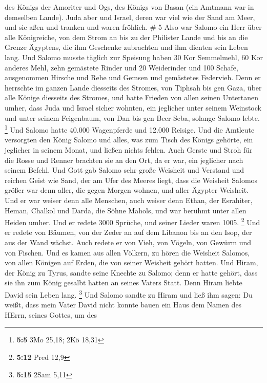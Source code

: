 des Königs der Amoriter und Ogs, des Königs von Basan (ein Amtmann war
in demselben Lande).  Juda aber und Israel, deren war viel
wie der Sand am Meer, und sie aßen und tranken und waren fröhlich. \# 5
 Also war Salomo ein Herr über alle Königreiche, von dem
Strom an bis zu der Philister Lande und bis an die Grenze Ägyptens, die
ihm Geschenke zubrachten und ihm dienten sein Leben lang. 
Und Salomo musste täglich zur Speisung haben 30 Kor Semmelmehl, 60 Kor
anderes Mehl,  zehn gemästete Rinder und 20 Weiderinder und
100 Schafe, ausgenommen Hirsche und Rehe und Gemsen und gemästetes
Federvieh.  Denn er herrschte im ganzen Lande diesseits des
Stromes, von Tiphsah bis gen Gaza, über alle Könige diesseits des
Stromes, und hatte Frieden von allen seinen Untertanen umher,
 dass Juda und Israel sicher wohnten, ein jeglicher unter
seinem Weinstock und unter seinem Feigenbaum, von Dan bis gen Beer-Seba,
solange Salomo lebte. \footnote{\textbf{5:5} 3Mo 25,18; 2Kö 18,31}
 Und Salomo hatte 40.000 Wagenpferde und 12.000 Reisige.
 Und die Amtleute versorgten den König Salomo und alles, was
zum Tisch des Königs gehörte, ein jeglicher in seinem Monat, und ließen
nichts fehlen.  Auch Gerste und Stroh für die Rosse und
Renner brachten sie an den Ort, da er war, ein jeglicher nach seinem
Befehl.  Und Gott gab Salomo sehr große Weisheit und
Verstand und reichen Geist wie Sand, der am Ufer des Meeres liegt,
 dass die Weisheit Salomos größer war denn aller, die gegen
Morgen wohnen, und aller Ägypter Weisheit.  Und er war
weiser denn alle Menschen, auch weiser denn Ethan, der Esrahiter, Heman,
Chalkol und Darda, die Söhne Mahols, und war berühmt unter allen Heiden
umher.  Und er redete 3000 Sprüche, und seiner Lieder waren
1005. \footnote{\textbf{5:12} Pred 12,9}  Und er redete von
Bäumen, von der Zeder an auf dem Libanon bis an den Isop, der aus der
Wand wächst. Auch redete er von Vieh, von Vögeln, von Gewürm und von
Fischen.  Und es kamen aus allen Völkern, zu hören die
Weisheit Salomos, von allen Königen auf Erden, die von seiner Weisheit
gehört hatten.  Und Hiram, der König zu Tyrus, sandte seine
Knechte zu Salomo; denn er hatte gehört, dass sie ihn zum König gesalbt
hatten an seines Vaters Statt. Denn Hiram liebte David sein Leben lang.
\footnote{\textbf{5:15} 2Sam 5,11}  Und Salomo sandte zu
Hiram und ließ ihm sagen:  Du weißt, dass mein Vater David
nicht konnte bauen ein Haus dem Namen des HErrn, seines Gottes, um des
